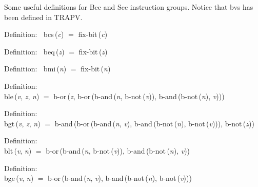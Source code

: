  Some useful definitions for Bcc and Scc instruction groups.  Notice that
 bvs has been defined in TRAPV.
\begin{tabbing}{\sc Definition}:$\;\;$
{\rm{bcs}}\,({\it{c\/}}) $=$ {\rm{fix-bit}}\,({\it{c\/}})
\end{tabbing}

\begin{tabbing}{\sc Definition}:$\;\;$
{\rm{beq}}\,({\it{z\/}}) $=$ {\rm{fix-bit}}\,({\it{z\/}})
\end{tabbing}

\begin{tabbing}{\sc Definition}:$\;\;$
{\rm{bmi}}\,({\it{n\/}}) $=$ {\rm{fix-bit}}\,({\it{n\/}})
\end{tabbing}

\begin{tabbing}{\sc Definition}: \\  
{\rm{ble}}\,({\it{v\/}}, {\it{z\/}}, {\it{n\/}}) $=$ {\rm{b-or}}\,({\it{z\/}}, {\rm{b-or}}\,({\rm{b-and}}\,({\it{n\/}}, {\rm{b-not}}\,({\it{v\/}})), {\rm{b-and}}\,({\rm{b-not}}\,({\it{n\/}}), {\it{v\/}})))
\end{tabbing}

\begin{tabbing}{\sc Definition}: \\  
{\rm{bgt}}\,({\it{v\/}}, {\it{z\/}}, {\it{n\/}}) $=$ {\rm{b-and}}\,({\rm{b-or}}\,({\rm{b-and}}\,({\it{n\/}}, {\it{v\/}}), {\rm{b-and}}\,({\rm{b-not}}\,({\it{n\/}}), {\rm{b-not}}\,({\it{v\/}}))), {\rm{b-not}}\,({\it{z\/}}))
\end{tabbing}

\begin{tabbing}{\sc Definition}: \\  
{\rm{blt}}\,({\it{v\/}}, {\it{n\/}}) $=$ {\rm{b-or}}\,({\rm{b-and}}\,({\it{n\/}}, {\rm{b-not}}\,({\it{v\/}})), {\rm{b-and}}\,({\rm{b-not}}\,({\it{n\/}}), {\it{v\/}}))
\end{tabbing}

\begin{tabbing}{\sc Definition}: \\  
{\rm{bge}}\,({\it{v\/}}, {\it{n\/}}) $=$ {\rm{b-or}}\,({\rm{b-and}}\,({\it{n\/}}, {\it{v\/}}), {\rm{b-and}}\,({\rm{b-not}}\,({\it{n\/}}), {\rm{b-not}}\,({\it{v\/}})))
\end{tabbing}


